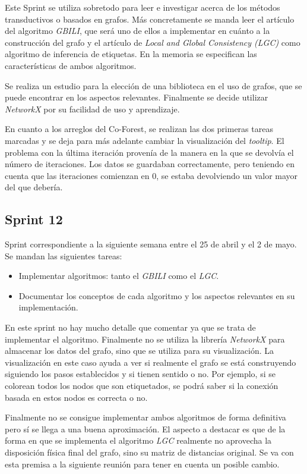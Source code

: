 Este Sprint se utiliza sobretodo para leer e investigar acerca de los métodos transductivos o basados en grafos. Más concretamente se manda leer el artículo del algoritmo \textit{GBILI}, que será uno de ellos a implementar en cuánto a la construcción del grafo y el artículo de \textit{Local and Global Consistency (LGC)} como algoritmo de inferencia de etiquetas. En la memoria se especifican las características de ambos algoritmos.
 
Se realiza un estudio para la elección de una biblioteca en el uso de grafos, que se puede encontrar en los aspectos relevantes. Finalmente se decide utilizar \textit{NetworkX} por su facilidad de uso y aprendizaje.

En cuanto a los arreglos del Co-Forest, se realizan las dos primeras tareas marcadas y se deja para más adelante cambiar la visualización del \textit{tooltip}. El problema con la última iteración provenía de la manera en la que se devolvía el número de iteraciones. Los datos se guardaban correctamente, pero teniendo en cuenta que las iteraciones comienzan en 0, se estaba devolviendo un valor mayor del que debería. 

\subsection{Sprint 12}
Sprint correspondiente a la siguiente semana entre el 25 de abril y el 2 de mayo. Se mandan las siguientes tareas:
\begin{itemize}
	\item Implementar algoritmos: tanto el \textit{GBILI} como el \textit{LGC}.
	\item Documentar los conceptos de cada algoritmo y los aspectos relevantes en su implementación.
\end{itemize}

En este sprint no hay mucho detalle que comentar ya que se trata de implementar el algoritmo. Finalmente no se utiliza la librería \textit{NetworkX} para almacenar los datos del grafo, sino que se utiliza para su visualización. La visualización en este caso ayuda a ver si realmente el grafo se está construyendo siguiendo los pasos establecidos y si tienen sentido o no. Por ejemplo, si se colorean todos los nodos que son etiquetados, se podrá saber si la conexión basada en estos nodos es correcta o no.

Finalmente no se consigue implementar ambos algoritmos de forma definitiva pero sí se llega a una buena aproximación. El aspecto a destacar es que de la forma en que se implementa el algoritmo \textit{LGC} realmente no aprovecha la disposición física final del grafo, sino su matriz de distancias original. Se va con esta premisa a la siguiente reunión para tener en cuenta un posible cambio.

